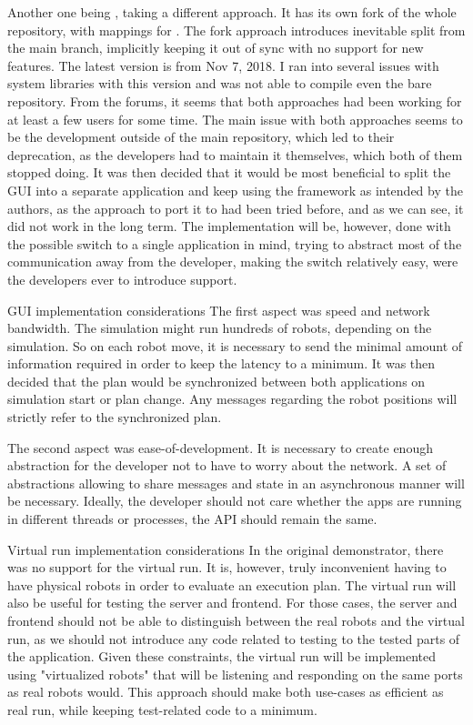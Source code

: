 Another one being {\ofnode}, taking a different approach. It has its own fork of the whole {\of} repository, with mappings for {\cmake}. The fork approach introduces inevitable split from the main branch, implicitly keeping it out of sync with no support for new features. \br
The latest version is from Nov 7, 2018. I ran into several issues with system libraries with this version and was not able to compile even the bare repository.\br\br
From the forums, it seems that both approaches had been working for at least a few users for some time. The main issue with both approaches seems to be the development outside of the main repository, which led to their deprecation, as the developers had to maintain it themselves, which both of them stopped doing.
It was then decided that it would be most beneficial to split the GUI into a separate application and keep using the framework as intended by the authors, as the approach to port it to {\cmake} had been tried before, and as we can see, it did not work in the long term.\br\br
The implementation will be, however, done with the possible switch to a single application in mind, trying to abstract most of the communication away from the developer, making the switch relatively easy, were the developers ever to introduce {\cmake} support.

\sec GUI implementation considerations
The first aspect was speed and network bandwidth. The simulation might run hundreds of robots, depending on the simulation. So on each robot move, it is necessary to send the minimal amount of information required in order to keep the latency to a minimum. 
It was then decided that the plan would be synchronized between both applications on simulation start or plan change. Any messages regarding the robot positions will strictly refer to the synchronized plan.

The second aspect was ease-of-development. It is necessary to create enough abstraction for the developer not to have to worry about the network. A set of abstractions allowing to share messages and state in an asynchronous manner will be necessary. Ideally, the developer should not care whether the apps are running in different threads or processes, the API should remain the same.

\sec Virtual run implementation considerations
In the original demonstrator, there was no support for the virtual run. It is, however, truly inconvenient having to have physical robots in order to evaluate an execution plan. The virtual run will also be useful for testing the server and frontend. For those cases, the server and frontend should not be able to distinguish between the real robots and the virtual run, as we should not introduce any code related to testing to the tested parts of the application. Given these constraints, the virtual run will be implemented using "virtualized robots" that will be listening and responding on the same ports as real robots would. This approach should make both use-cases as efficient as real run, while keeping test-related code to a minimum.


